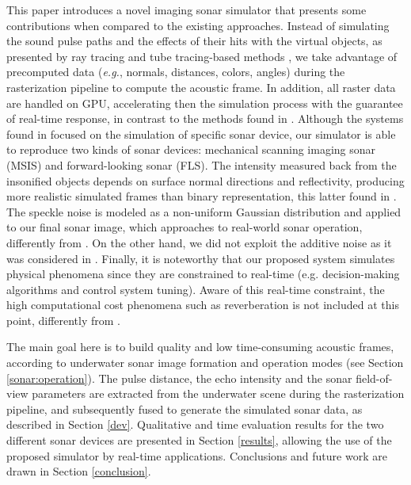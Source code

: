\documentclass[final,5p,times]{elsarticle}
\begin{document}
This paper introduces a novel imaging sonar simulator that presents some contributions when compared to the existing approaches. Instead of simulating the sound pulse paths and the effects of their hits with the virtual objects, as presented by ray tracing and tube tracing-based methods \cite{bell1997,coiras2009,sac2015,demarco2015,gu2013,kwak2015,gueriot2010}, we take advantage of precomputed data (\textit{e.g.}, normals, distances, colors, angles) during the rasterization pipeline to compute the acoustic frame. In addition, all raster data are handled on GPU, accelerating then the simulation process with the guarantee of real-time response, in contrast to the methods found in \cite{bell1997,coiras2009,sac2015,demarco2015}. Although the systems found in \cite{bell1997,coiras2009,sac2015,demarco2015,gu2013,kwak2015,gueriot2010} focused on the simulation of specific sonar device, our simulator is able to reproduce two kinds of sonar devices: mechanical scanning imaging sonar (MSIS) and forward-looking sonar (FLS). The intensity measured back from the insonified objects depends on surface normal directions and reflectivity, producing more realistic simulated frames than binary representation, this latter found in \cite{gu2013,kwak2015}. The speckle noise is modeled as a non-uniform Gaussian distribution and applied to our final sonar image, which approaches to real-world sonar operation, differently from \cite{sac2015,demarco2015,gu2013,kwak2015,gueriot2010}. On the other hand, we did not exploit the additive noise as it was considered in \cite{sac2015,demarco2015}. Finally, it is noteworthy that our proposed system simulates physical phenomena since they are constrained to real-time (e.g. decision-making algorithms and control system tuning). Aware of this real-time constraint, the high computational cost phenomena such as reverberation is not included at this point, differently from \cite{sac2015,gueriot2010}.

The main goal here is to build quality and low time\hyp{}consuming acoustic frames, according to underwater sonar image formation and operation modes (see Section \ref{sonar:operation}). The pulse distance, the echo intensity and the sonar field-of-view parameters are extracted from the underwater scene during the rasterization pipeline, and subsequently fused to generate the simulated sonar data, as described in Section \ref{dev}. Qualitative and time evaluation results for the two different sonar devices are presented in Section \ref{results}, allowing the use of the proposed simulator by real-time applications. Conclusions and future work are drawn in Section \ref{conclusion}.
\end{document}
